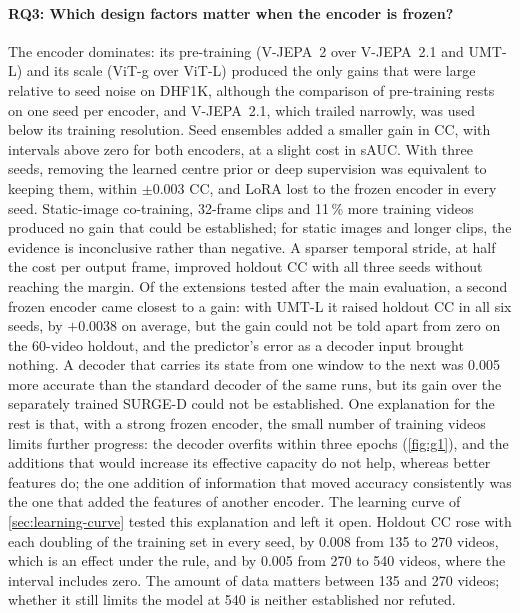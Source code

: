 \paragraph{RQ3: Which design factors matter when the encoder is frozen?} The
encoder dominates: its pre-training (\acrshort{V-JEPA}~2 over \acrshort{V-JEPA}~2.1 and \acrshort{UMT}-L) and its
scale (\acrshort{ViT}-g over \acrshort{ViT}-L) produced the only gains that were large relative to
seed noise on DHF1K, although the comparison of pre-training rests on one seed
per encoder, and \acrshort{V-JEPA}~2.1, which trailed narrowly, was used below its training
resolution. Seed ensembles added a smaller gain in \acrshort{CC}, with intervals above zero
for both encoders, at a slight cost in \acrshort{sAUC}. With three seeds, removing the learned
centre prior or deep supervision was equivalent to keeping them, within
$\pm0.003$ \acrshort{CC}, and \acrshort{LoRA} lost to the frozen encoder in every seed. Static-image
co-training, 32-frame clips and 11\,\% more training videos produced no gain
that could be established; for static images and longer clips, the evidence is
inconclusive rather than negative. A sparser temporal stride, at half the cost
per output frame, improved holdout \acrshort{CC} with all three seeds without reaching
the margin. Of the extensions tested after the main evaluation, a second frozen
encoder came closest to a gain: with \acrshort{UMT}-L it raised holdout \acrshort{CC} in
all six seeds, by $+0.0038$ on average, but the gain could not be told apart
from zero on the 60-video holdout, and the predictor's error as a decoder input
brought nothing. A decoder that carries its state from one window to the next
was 0.005 more accurate than the standard decoder of the same runs, but its
gain over the separately trained SURGE-D could not be established. One explanation for the rest is that, with a strong frozen encoder, the small
number of training videos limits further progress: the decoder overfits within
three epochs (\cref{fig:g1}), and the additions that would increase its
effective capacity do not help, whereas better features do; the one addition of
information that moved accuracy consistently was the one that added the
features of another encoder. The learning curve
of \cref{sec:learning-curve} tested this explanation and left it open. Holdout
\acrshort{CC} rose with each doubling of the training set in every seed, by
0.008 from 135 to 270 videos, which is an effect under the rule, and by 0.005
from 270 to 540 videos, where the interval includes zero. The amount of data
matters between 135 and 270 videos; whether it still limits the model at 540
is neither established nor refuted.

